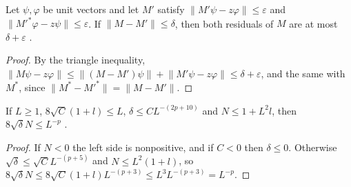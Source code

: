 \begin{theorem}
    \label{thm:gaussian_two_sided_nearby}
    \leanok
    Let $\psi,\varphi$ be unit vectors and let $M'$ satisfy
    $\lVert M'\psi-z\varphi\rVert\le\varepsilon$ and
    $\lVert M'^*\varphi-z\psi\rVert\le\varepsilon$. If $\lVert M-M'\rVert\le\delta$,
    then both residuals of $M$ are at most $\delta+\varepsilon$
    \cite[Section~2]{OpenAI2026PolynomialPEPS}.
\end{theorem}
\begin{proof}\leanok
    By the triangle inequality,
    $\lVert M\psi-z\varphi\rVert\le\lVert(M-M')\psi\rVert+\lVert M'\psi-z\varphi\rVert
    \le\delta+\varepsilon$, and the same with $M^*$, since
    $\lVert M^*-M'^*\rVert=\lVert M-M'\rVert$.
\end{proof}

\begin{theorem}
    \label{thm:gaussian_reset_scalar}
    \leanok
    If $L\ge1$, $8\sqrt C(1+l)\le L$, $\delta\le CL^{-(2p+10)}$ and $N\le1+L^2l$, then
    $8\sqrt\delta N\le L^{-p}$ \cite[Section~2]{OpenAI2026PolynomialPEPS}.
\end{theorem}
\begin{proof}\leanok
    If $N<0$ the left side is nonpositive, and if $C<0$ then $\delta\le0$. Otherwise
    $\sqrt\delta\le\sqrt CL^{-(p+5)}$ and $N\le L^2(1+l)$, so
    $8\sqrt\delta N\le8\sqrt C(1+l)L^{-(p+3)}\le L^3L^{-(p+3)}=L^{-p}$.
\end{proof}

